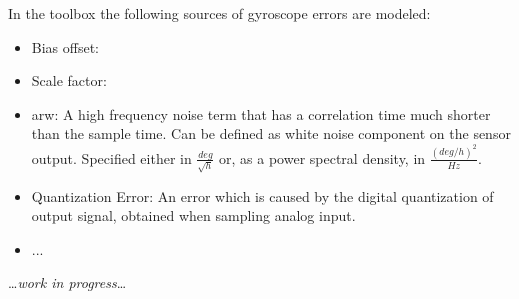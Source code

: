         In the toolbox the following sources of gyroscope errors are modeled:
        \begin{itemize}
            \item Bias offset:
            \item Scale factor: 
            \item \ac{arw}: A high frequency noise term that has a correlation time much shorter than the sample time. Can be defined as white noise component on the sensor output. Specified either in $\frac{deg}{\sqrt{h}}$ or, as a power spectral density, in $\frac{(deg/h)^2}{Hz}$. %
            \item Quantization Error: An error which is caused by the digital quantization of output signal, obtained when sampling analog input.
            \item ...
        \end{itemize}
        

        \dots\textit{work in progress}\dots




